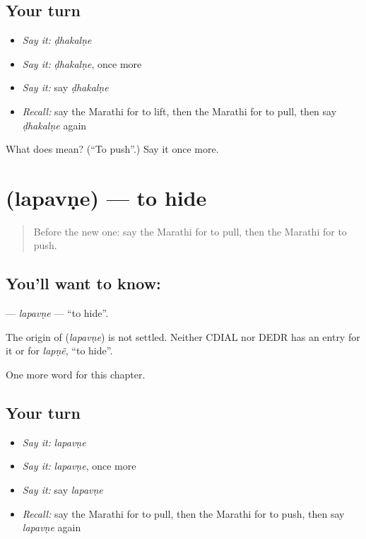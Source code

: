 \subsection*{Your turn}
\begin{itemize}
\raggedright
  \item \emph{Say it:} \emph{ḍhakalṇe}
  \item \emph{Say it:} \emph{ḍhakalṇe}, once more
  \item \emph{Say it:} say \emph{ḍhakalṇe}
  \item \emph{Recall:} say the Marathi for to lift, then the Marathi for to pull, then say \emph{ḍhakalṇe} again
\end{itemize}

\begin{tcolorbox}[breakable,colback=teal!4,colframe=teal!35!black,title={Before you move on}]
What does  mean? (\textquotedblleft{}To push\textquotedblright{}.) Say it once more.
\end{tcolorbox}
\section[\texorpdfstring{\mr{लपवणे} (lapavṇe)}{लपवणे (lapavṇe)}]{ (lapavṇe) — to hide}

\label{lesson:MR-C83-lapavne}



\begin{quote}
Before the new one: say the Marathi for to pull, then the Marathi for to push.
\end{quote}

\subsection*{You'll want to know: }
\textbf{} — \emph{lapavṇe} — \textquotedblleft{}to hide\textquotedblright{}.

\begin{cousinweb}
The origin of \textbf{} (\emph{lapavṇe}) is not settled. Neither CDIAL nor DEDR has an entry for it or for \emph{lapṇẽ}, \textquotedblleft{}to hide\textquotedblright{}.
\end{cousinweb}

\begin{grammarlens}[title={What you've built}]
One more word for this chapter.
\end{grammarlens}

\subsection*{Your turn}
\begin{itemize}
\raggedright
  \item \emph{Say it:} \emph{lapavṇe}
  \item \emph{Say it:} \emph{lapavṇe}, once more
  \item \emph{Say it:} say \emph{lapavṇe}
  \item \emph{Recall:} say the Marathi for to pull, then the Marathi for to push, then say \emph{lapavṇe} again
\end{itemize}

